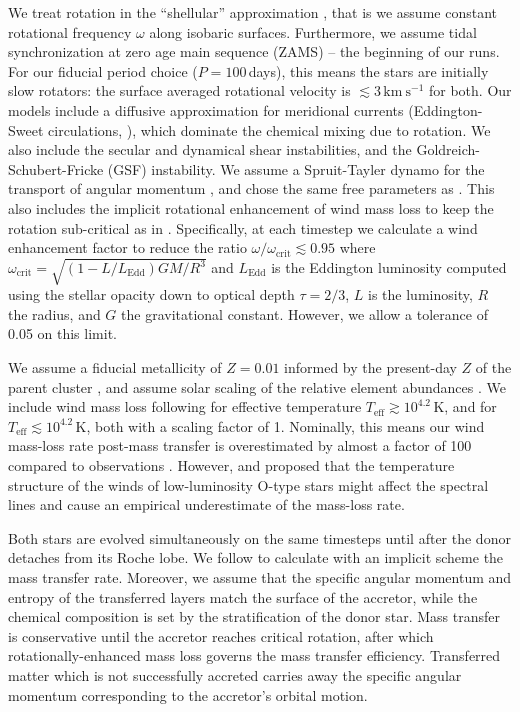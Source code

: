 \documentclass[twocolumn,twocolappendix,trackchanges]{aastex63}
\newcommand{\kms}{{\mathrm{km\ s^{-1}}}}
\begin{document}
We treat rotation in the ``shellular'' approximation
\citep[e.g.,][]{zahn:92, ekstrom:12}, that is we
assume constant rotational frequency $\omega$ along isobaric
surfaces. Furthermore, we assume tidal synchronization at zero age
main sequence (ZAMS) -- the beginning of our runs. For our fiducial
period choice ($P=100$\,days), this means the stars are initially slow
rotators: the surface averaged rotational velocity is
$\lesssim3\,\kms$ for both. Our models include a diffusive
approximation for meridional currents (Eddington-Sweet circulations, \citealt{sweet:50}), which
dominate the chemical mixing due to rotation. We also include the
secular and dynamical shear instabilities, and the
Goldreich-Schubert-Fricke (GSF) instability.  We assume a Spruit-Tayler
dynamo for the transport of angular momentum \citep{spruit:02}, and
chose the same free parameters as \cite{heger:00}. This also includes
the implicit rotational enhancement of wind mass loss to keep the
rotation sub-critical as in \cite{langer:98}. Specifically, at each
timestep we calculate a wind enhancement factor to reduce the ratio
$\omega/\omega_\mathrm{crit}\lesssim 0.95$ where
$\omega_\mathrm{crit}=\sqrt{(1-L/L_\mathrm{Edd})GM/R^3}$ and
$L_\mathrm{Edd}$ is the Eddington luminosity computed using the
stellar opacity down to optical depth
$\tau=2/3$, $L$ is the luminosity, $R$ the radius, and $G$
the gravitational constant. However, we allow a tolerance of 0.05 on
this limit.



We assume a fiducial metallicity of $Z=0.01$ informed by the
present-day $Z$ of the parent cluster \citep{murphy:21}, and assume
solar scaling of the relative element abundances \citep{grevesse:98}. We include wind mass loss following
\cite{vink:00,vink:01} for effective
temperature $T_\mathrm{eff}\gtrsim10^{4.2}$\,K, and \cite{dejager:88} for  $T_\mathrm{eff}\lesssim10^{4.2}$\,K, both with a scaling
factor of 1. Nominally, this means our wind mass-loss rate post-mass
transfer is overestimated by almost a factor of 100 compared to
observations \citep[weak wind problem, see][]{marcolino:09}.  However,
\cite{lucy:12} and \cite{lagae:21} proposed that the temperature
structure of the winds of low-luminosity O-type stars might affect the
spectral lines and cause an empirical underestimate of the mass-loss
rate.

Both stars are evolved simultaneously on the same timesteps until
after the donor detaches from its Roche lobe. We follow \cite{kolb:90}
to calculate with an implicit scheme the mass transfer rate. Moreover, we
assume that the specific angular momentum and entropy of the
transferred layers match the surface of the accretor, while the chemical composition
is set by the stratification of the donor star. Mass transfer is
conservative until the accretor reaches critical rotation, after which
rotationally-enhanced mass loss governs the mass transfer efficiency.
Transferred matter which is not successfully accreted carries away the
specific angular momentum corresponding to the accretor's orbital
motion.
\end{document}
